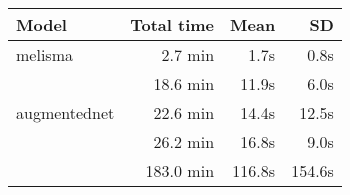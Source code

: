 \begin{tabular}{l|rrr}
    Model                        & Total time & Mean    & SD     \\ \hline
    \gls{melisma}                & 2.7 min    & 1.7s    & 0.8s   \\
    \textcite{micchi2021deep}    & 18.6 min   & 11.9s   & 6.0s  \\
    \gls{augmentednet}           & 22.6 min   & 14.4s   & 12.5s  \\
    \textcite{chen2021attend}    & 26.2 min   & 16.8s   & 9.0s   \\
    \textcite{mcleod2021modular} & 183.0 min  & 116.8s  & 154.6s \\
\end{tabular}
